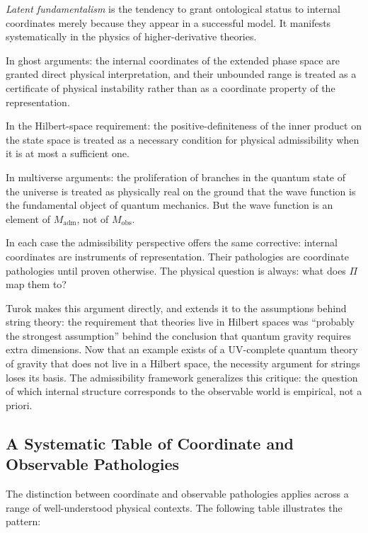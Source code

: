 \documentclass[12pt,a4paper]{article}
\theoremstyle{remark}
\begin{document}
\emph{Latent fundamentalism} is the tendency to grant ontological status
to internal coordinates merely because they appear in a successful model.
It manifests systematically in the physics of higher-derivative theories.

In ghost arguments: the internal coordinates of the extended phase space
are granted direct physical interpretation, and their unbounded range is
treated as a certificate of physical instability rather than as a coordinate
property of the representation.

In the Hilbert-space requirement: the positive-definiteness of the inner
product on the state space is treated as a necessary condition for
physical admissibility when it is at most a sufficient one.

In multiverse arguments: the proliferation of branches in the quantum
state of the universe is treated as physically real on the ground that the
wave function is the fundamental object of quantum mechanics. But the wave
function is an element of $M_{\mathrm{adm}}$, not of $M_{\mathrm{obs}}$.

In each case the admissibility perspective offers the same corrective:
internal coordinates are instruments of representation. Their pathologies
are coordinate pathologies until proven otherwise. The physical question
is always: what does $\Pi$ map them to?

Turok makes this argument directly, and extends it to the assumptions behind
string theory: the requirement that theories live in Hilbert spaces was
``probably the strongest assumption'' behind the conclusion that quantum
gravity requires extra dimensions. Now that an example exists of a
UV-complete quantum theory of gravity that does not live in a Hilbert
space, the necessity argument for strings loses its basis. The admissibility
framework generalizes this critique: the question of which internal structure
corresponds to the observable world is empirical, not a priori.

\subsection{A Systematic Table of Coordinate and Observable Pathologies}

The distinction between coordinate and observable pathologies applies
across a range of well-understood physical contexts. The following table
illustrates the pattern:
\end{document}
